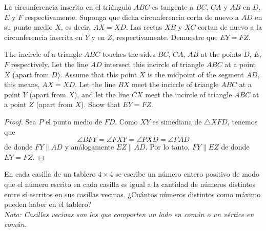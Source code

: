 \begin{probMG}[IberoAmerican 1995/5]
	La circunferencia inscrita en el triángulo $ABC$ es tangente a $BC$, $CA$ y $AB$ en $D$, $E$ y $F$ respectivamente. Suponga que dicha circunferencia corta de nuevo a $AD$ en su punto medio $X$, es decir, $AX=XD$. Las rectas $XB$ y $XC$ cortan de nuevo a la circunferencia inscrita en $Y$ y en $Z$, respectivamente. Demuestre que $EY=FZ$.
	\begin{hint}
		The incircle of a triangle $ABC$ touches the sides $BC$, $CA$, $AB$ at the points $D$, $E$, $F$ respectively. Let the line $AD$ intersect this incircle of triangle $ABC$ at a point $X$ (apart from $D$). Assume that this point $X$ is the midpoint of the segment $AD$, this means, $AX=XD$. Let the line $BX$ meet the incircle of triangle $ABC$ at a point $Y$ (apart from $X$), and let the line $CX$ meet the incircle of triangle $ABC$ at a point $Z$ (apart from $X$). Show that $EY=FZ$.
	\end{hint}
\end{probMG}

\begin{proof}
	Sea $P$ el punto medio de $FD$. Como $XY$ es simediana de $\triangle XFD$, tenemos que
	\[\angle BFY=\angle FXY=\angle PXD=\angle FAD\]
	de donde $FY\parallel AD$ y análogamente $EZ\parallel AD$. Por lo tanto, $FY\parallel EZ$ de donde $EY=FZ$.
\end{proof}


\begin{probEB}
	En cada casilla de un tablero $4\times 4$ se escribe un número entero positivo de modo que el número escrito en cada casilla es igual a la cantidad de números distintos entre sí escritos en sus casillas vecinas. ¿Cuántos números distintos como máximo pueden haber en el tablero?\\[4pt]
	\emph{Nota: Casillas vecinas son las que comparten un lado en común o un vértice en común.}
\end{probEB}

